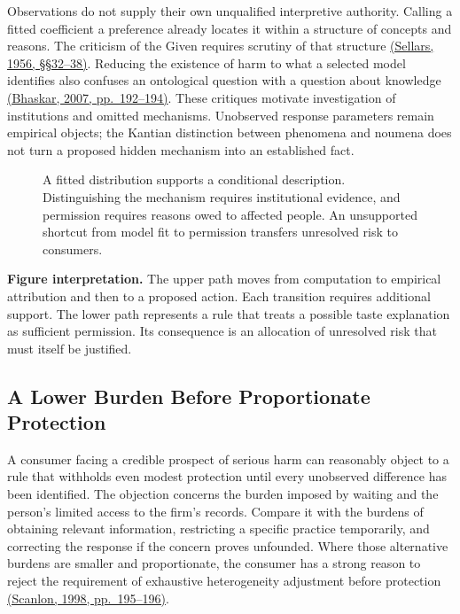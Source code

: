 Observations do not supply their own unqualified interpretive authority.
Calling a fitted coefficient a preference already locates it within a
structure of concepts and reasons. The criticism of the Given requires
scrutiny of that structure
\href{https://www.ditext.com/sellars/epm8.html}{(Sellars, 1956,
§§32--38)}. Reducing the existence of harm to what a selected model
identifies also confuses an ontological question with a question about
knowledge
\href{https://internationalcentreforcriticalrealism.wordpress.com/wp-content/uploads/2013/04/07-1-bhaskar-theorising-ontology-2007.pdf}{(Bhaskar,
2007, pp.~192--194)}. These critiques motivate investigation of
institutions and omitted mechanisms. Unobserved response parameters
remain empirical objects; the Kantian distinction between phenomena and
noumena does not turn a proposed hidden mechanism into an established
fact.

\begin{figure}[htbp]
\centering

\caption{A fitted distribution supports a conditional description. Distinguishing the mechanism requires institutional evidence, and permission requires reasons owed to affected people. An unsupported shortcut from model fit to permission transfers unresolved risk to consumers.}\label{fig:M09_heterogeneity_modality}
\end{figure}

\textbf{Figure interpretation.} The upper path moves from computation to
empirical attribution and then to a proposed action. Each transition
requires additional support. The lower path represents a rule that
treats a possible taste explanation as sufficient permission. Its
consequence is an allocation of unresolved risk that must itself be
justified.

\hypertarget{M09-a-lower-burden-before-proportionate-protection}{%
\subsection{A Lower Burden Before Proportionate
Protection}\label{M09-a-lower-burden-before-proportionate-protection}}

\noindent \noindent A consumer facing a credible prospect of serious harm can
reasonably object to a rule that withholds even modest protection until
every unobserved difference has been identified. The objection concerns
the burden imposed by waiting and the person's limited access to the
firm's records. Compare it with the burdens of obtaining relevant
information, restricting a specific practice temporarily, and correcting
the response if the concern proves unfounded. Where those alternative
burdens are smaller and proportionate, the consumer has a strong reason
to reject the requirement of exhaustive heterogeneity adjustment before
protection
\href{https://e-edu.nbu.bg/pluginfile.php/314831/mod_resource/content/0/scanlon_5.1-3.pdf}{(Scanlon,
1998, pp.~195--196)}.

